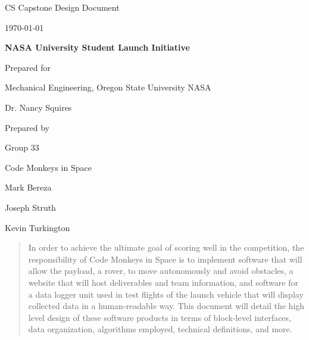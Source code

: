 \documentclass[onecolumn, draftclsnofoot,10pt, compsoc]{IEEEtran}
\def \CapstoneTeamName{Code Monkeys in Space}
\def \CapstoneTeamNumber{		33}
\def \GroupMemberOne{			Mark Bereza}
\def \GroupMemberTwo{			Joseph Struth}
\def \GroupMemberThree{			Kevin Turkington}
\def \CapstoneProjectName{		NASA University Student Launch Initiative}
\def \CapstoneSponsorCompany{	Mechanical Engineering, Oregon State University NASA}
\def \CapstoneSponsorPerson{		Dr. Nancy Squires}
\def \DocType{	%
				Design Document
				}
\newcommand{\NameSigPair}[1]{\par
\makebox[2.75in][r]{#1} \hfil 	\makebox[3.25in]{\makebox[2.25in]{\hrulefill} \hfill		\makebox[.75in]{\hrulefill}}
\par\vspace{-12pt} \textit{\tiny\noindent
\makebox[2.75in]{} \hfil		\makebox[3.25in]{\makebox[2.25in][r]{Signature} \hfill	\makebox[.75in][r]{Date}}}}
\renewcommand{\NameSigPair}[1]{#1}
\begin{document}
\begin{titlepage}
    \begin{singlespace}
        \hfill 
        \par\vspace{.2in}
        \centering
        \scshape{
            \huge CS Capstone \DocType \par
            {\large\today}\par
            \vspace{.5in}
            \textbf{\Huge\CapstoneProjectName}\par
            \vfill
            {\large Prepared for}\par
            \Huge \CapstoneSponsorCompany\par
            \vspace{5pt}
            {\Large\NameSigPair{\CapstoneSponsorPerson}\par}
            {\large Prepared by }\par
            Group\CapstoneTeamNumber\par
            \CapstoneTeamName\par 
            \vspace{5pt}
            {\Large
                \NameSigPair{\GroupMemberOne}\par
                \NameSigPair{\GroupMemberTwo}\par
                \NameSigPair{\GroupMemberThree}\par
            }
            \vspace{20pt}
        }
        \begin{abstract}
        	In order to achieve the ultimate goal of scoring well in the competition, the responsibility of Code Monkeys in Space is to implement software that will allow the payload, a rover, to move autonomously and avoid obstacles, a website that will host deliverables and team information, and software for a data logger unit used in test flights of the launch vehicle that will display collected data in a human-readable way. This document will detail the high level design of these software products in terms of block-level interfaces, data organization, algorithms employed, technical definitions, and more.
        \end{abstract}     
    \end{singlespace}
\end{titlepage}
\newpage
{}
\tableofcontents
\listoffigures
\clearpage
\end{document}
